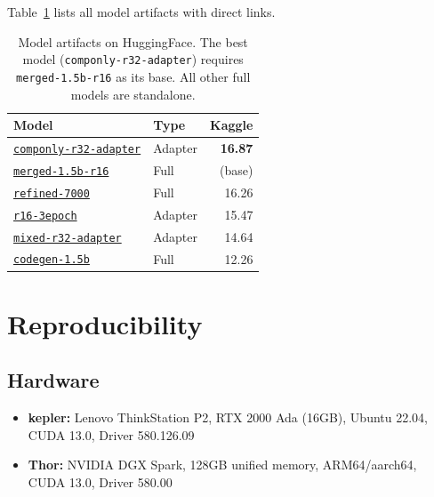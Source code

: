 \documentclass[11pt]{article}
\begin{document}
\noindent Table~\ref{tab:model-artifacts} lists all model artifacts with direct links.

\begin{table}[h]
\centering
\small
\begin{tabular}{p{2.8cm}p{1.2cm}r}
\toprule
\textbf{Model} & \textbf{Type} & \textbf{Kaggle} \\
\midrule
\href{https://huggingface.co/kaleidoscopicwhether/svg-gen-weights/tree/main/componly-r32-adapter}{\texttt{componly-r32-adapter}} & Adapter & \textbf{16.87} \\
\href{https://huggingface.co/kaleidoscopicwhether/svg-gen-weights/tree/main/merged-1.5b-r16}{\texttt{merged-1.5b-r16}} & Full & (base) \\
\href{https://huggingface.co/kaleidoscopicwhether/svg-gen-weights/tree/main/refined-7000}{\texttt{refined-7000}} & Full & 16.26 \\
\href{https://huggingface.co/kaleidoscopicwhether/svg-gen-weights/tree/main/r16-3epoch}{\texttt{r16-3epoch}} & Adapter & 15.47 \\
\href{https://huggingface.co/kaleidoscopicwhether/svg-gen-weights/tree/main/mixed-r32-adapter}{\texttt{mixed-r32-adapter}} & Adapter & 14.64 \\
\href{https://huggingface.co/kaleidoscopicwhether/svg-gen-weights/tree/main/codegen-1.5b}{\texttt{codegen-1.5b}} & Full & 12.26 \\
\bottomrule
\end{tabular}
\caption{Model artifacts on HuggingFace. The best model (\texttt{componly-r32-adapter}) requires \texttt{merged-1.5b-r16} as its base. All other full models are standalone.}
\label{tab:model-artifacts}
\end{table}





\appendix

\section{Reproducibility}

\subsection{Hardware}
\begin{itemize}
    \item \textbf{kepler:} Lenovo ThinkStation P2, RTX 2000 Ada (16GB), Ubuntu 22.04, CUDA 13.0, Driver 580.126.09
    \item \textbf{Thor:} NVIDIA DGX Spark, 128GB unified memory, ARM64/aarch64, CUDA 13.0, Driver 580.00
\end{itemize}
\end{document}
